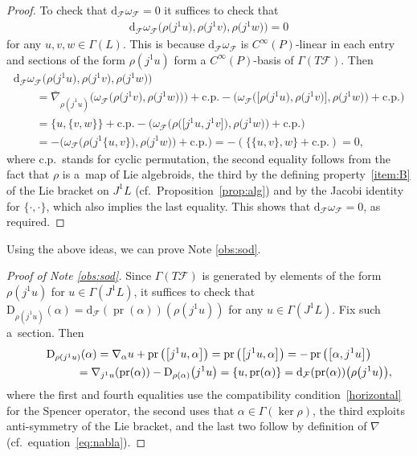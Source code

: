 \documentclass[10pt,a4paper]{amsart}
\numberwithin{equation}{section}
\newcommand{\pr}{\operatorname{pr}}
\newcommand{\de}{\mathrm{d}} %
\begin{document}
\begin{proof}
 To check that $\de_{\mathcal{F}}\omega_{\mathcal{F}} =0$ it suf\/f\/ices to check that
 \begin{gather*}
 \de_{\mathcal{F}}\omega_{\mathcal{F}}\big(\rho\big(j^1u\big),\rho\big(j^1v\big),\rho\big(j^1w\big)\big) =0
 \end{gather*}
for any $u,v,w \in \Gamma(L)$. This is because $\de_{\mathcal{F}}\omega_{\mathcal{F}}$ is $C^{\infty}(P)$-linear in each entry and sections of the form $\rho(j^1u)$ form a $C^{\infty}(P)$-basis of $\Gamma(T \mathcal{F})$. Then
 \begin{gather*}
\de_{\mathcal{F}}\omega_{\mathcal{F}}\big(\rho\big(j^1u\big),\rho\big(j^1v\big),\rho\big(j^1w\big)\big)\\
\qquad {} = \bar{\nabla}_{\rho(j^1u)}\big(\omega_{\mathcal{F}}\big(\rho\big(j^1v\big),\rho\big(j^1w\big)\big)\big)+ \mathrm{c.p.}
 - \big(\omega_{\mathcal{F}}\big(\big[\rho\big(j^1u\big),\rho\big(j^1v\big)\big],\rho\big(j^1w\big)\big) + \mathrm{c.p.}\big)\\
 \qquad{} = \{u,\{v,w\}\} + \mathrm{c.p.} - \big(\omega_{\mathcal{F}}\big(\rho\big(\big[j^1u,j^1v\big]\big), \rho\big(j^1w\big)\big) + \mathrm{c.p.}\big) \\
 \qquad {} = -\big(\omega_{\mathcal{F}}\big(\rho\big(j^1\{u,v\}\big),\rho\big(j^1w\big)\big) + \mathrm{c.p.}\big) =-(\{\{u,v\},w\} + \mathrm{c.p.}) = 0,
 \end{gather*}
where c.p.\ stands for cyclic permutation, the second equality follows from the fact that $\rho$ is a~map of Lie algebroids, the third by the def\/ining property~\ref{item:B} of the Lie bracket on $J^1 L$ (cf.\ Proposition~\ref{prop:alg}) and by the Jacobi identity for $\{\cdot,\cdot\}$, which also implies the last equality. This shows that $\de_{\mathcal{F}}\omega_{\mathcal{F}} = 0$, as required.
\end{proof}

Using the above ideas, we can prove Note \ref{obs:sod}.

\begin{proof}[Proof of Note \ref{obs:sod}]
Since $\Gamma(T\mathcal{F})$ is generated by elements of the form $\rho(j^1u)$ for $u \in \Gamma(J^1L)$, it suf\/f\/ices to check that $\mathrm{D}_{\rho(j^1u)}(\alpha) = \de_{\mathcal{F}}(\pr(\alpha))(\rho (j^1u))$ for any $u \in \Gamma(J^1L)$. Fix such a~section. Then
\begin{gather*}
 \mathrm{D}_{\rho(j^1u)}(\alpha) = \nabla_{\alpha} u + \pr\big(\big[j^1u,\alpha\big]\big) = \pr\big(\big[j^1u,\alpha\big]\big) = - \pr\big(\big[\alpha,j^1u\big]\big) \\
\hphantom{\mathrm{D}_{\rho(j^1u)}(\alpha)}{} = \nabla_{j^1u}(\pr(\alpha)) - \mathrm{D}_{\rho(\alpha) }\big(j^1u\big)
 = \{u,\pr(\alpha)\} = \de_{\mathcal{F}} (\pr(\alpha) )\big(\rho\big(j^1u\big)\big),
 \end{gather*}
where the f\/irst and fourth equalities use the compatibility condition~\eqref{horizontal} for the Spencer operator, the second uses that $\alpha \in \Gamma(\ker \rho)$, the third exploits anti-symmetry of the Lie bracket, and the last two follow by def\/inition of $\nabla$ (cf.\ equation~\eqref{eq:nabla}).
\end{proof}
\end{document}
